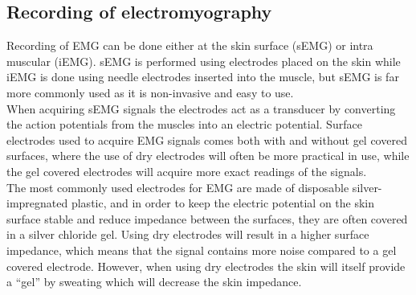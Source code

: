\subsection{Recording of electromyography}

Recording of EMG can be done either at the skin surface (sEMG) or intra muscular (iEMG). sEMG is performed using electrodes placed on the skin while iEMG is done using needle electrodes inserted into the muscle, but sEMG is far more commonly used as it is non-invasive and easy to use. \cite{cram2012}  \\
When acquiring sEMG signals the electrodes act as a transducer by converting the action potentials from the muscles into an electric potential. Surface electrodes used to acquire EMG signals comes both with and without gel covered surfaces, where the use of dry electrodes will often be more practical in use, while the gel covered electrodes will acquire more exact readings of the signals. \cite{lee2008, cram2012}\\
The most commonly used electrodes for EMG are made of disposable silver-impregnated plastic, and in order to keep the electric potential on the skin surface stable and reduce impedance between the surfaces, they are often covered in a silver chloride gel. Using dry electrodes will result in a higher surface impedance, which means that the signal contains more noise compared to a gel covered electrode. However, when using dry electrodes the skin will itself provide a “gel” by sweating which will decrease the skin impedance. \cite{cram2012}



